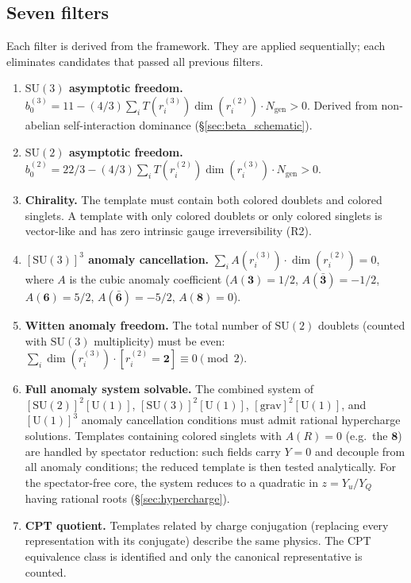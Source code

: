 \documentclass[11pt,a4paper]{article}
\theoremstyle{definition}
\newcommand{\SU}{\mathrm{SU}}
\newcommand{\U}{\mathrm{U}}
\begin{document}
\subsection{Seven filters}
\label{sec:seven_filters}

Each filter is derived from the framework.  They are applied
sequentially; each eliminates candidates that passed all previous
filters.

\begin{enumerate}[label=\textbf{F\arabic*},nosep,leftmargin=3em]
  \item \textbf{$\SU(3)$ asymptotic freedom.}\quad
  $b_0^{(3)} = 11 - (4/3) \sum_i T(r_i^{(3)}) \dim(r_i^{(2)}) \cdot N_{\mathrm{gen}} > 0$.
  Derived from non-abelian self-interaction dominance (\S\ref{sec:beta_schematic}).

  \item \textbf{$\SU(2)$ asymptotic freedom.}\quad
  $b_0^{(2)} = 22/3 - (4/3) \sum_i T(r_i^{(2)}) \dim(r_i^{(3)}) \cdot N_{\mathrm{gen}} > 0$.

  \item \textbf{Chirality.}\quad
  The template must contain both colored doublets and colored singlets.
  A template with only colored doublets or only colored singlets is
  vector-like and has zero intrinsic gauge irreversibility (R2).

  \item \textbf{$[\SU(3)]^3$ anomaly cancellation.}\quad
  $\sum_i A(r_i^{(3)}) \cdot \dim(r_i^{(2)}) = 0$, where $A$ is the
  cubic anomaly coefficient ($A(\mathbf{3}) = 1/2$,
  $A(\bar{\mathbf{3}}) = -1/2$, $A(\mathbf{6}) = 5/2$,
  $A(\bar{\mathbf{6}}) = -5/2$, $A(\mathbf{8}) = 0$).

  \item \textbf{Witten anomaly freedom.}\quad
  The total number of $\SU(2)$ doublets (counted with $\SU(3)$ multiplicity)
  must be even: $\sum_i \dim(r_i^{(3)}) \cdot [r_i^{(2)} = \mathbf{2}]
  \equiv 0 \pmod{2}$.

  \item \textbf{Full anomaly system solvable.}\quad
  The combined system of $[\SU(2)]^2[\U(1)]$, $[\SU(3)]^2[\U(1)]$,
  $[\mathrm{grav}]^2[\U(1)]$, and $[\U(1)]^3$ anomaly cancellation
  conditions must admit rational hypercharge solutions.  Templates
  containing colored singlets with $A(R) = 0$ (e.g.\ the $\mathbf{8}$)
  are handled by spectator reduction: such fields carry $Y = 0$ and
  decouple from all anomaly conditions; the reduced template is then
  tested analytically.  For the spectator-free core, the system reduces
  to a quadratic in $z = Y_u/Y_Q$ having rational roots
  (\S\ref{sec:hypercharge}).

  \item \textbf{CPT quotient.}\quad
  Templates related by charge conjugation (replacing every representation
  with its conjugate) describe the same physics.  The CPT equivalence
  class is identified and only the canonical representative is counted.
\end{enumerate}
\end{document}
